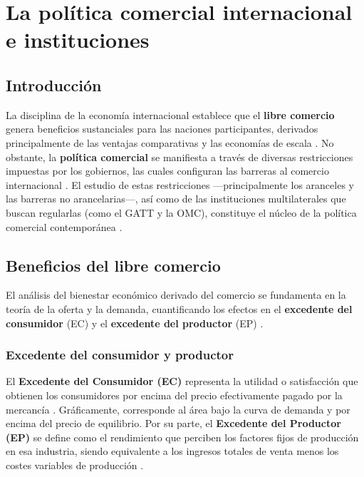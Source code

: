 \chapter{La política comercial internacional e instituciones}

\section{Introducción}

La disciplina de la economía internacional establece que el \textbf{libre comercio} genera beneficios sustanciales para las naciones participantes, derivados principalmente de las ventajas comparativas y las economías de escala . No obstante, la \textbf{política comercial} se manifiesta a través de diversas restricciones impuestas por los gobiernos, las cuales configuran las barreras al comercio internacional . El estudio de estas restricciones —principalmente los aranceles y las barreras no arancelarias—, así como de las instituciones multilaterales que buscan regularlas (como el GATT y la OMC), constituye el núcleo de la política comercial contemporánea .

\section{Beneficios del libre comercio}
El análisis del bienestar económico derivado del comercio se fundamenta en la teoría de la oferta y la demanda, cuantificando los efectos en el \textbf{excedente del consumidor} (EC) y el \textbf{excedente del productor} (EP) .

\subsection{Excedente del consumidor y productor}
El \textbf{Excedente del Consumidor (EC)} representa la utilidad o satisfacción que obtienen los consumidores por encima del precio efectivamente pagado por la mercancía . Gráficamente, corresponde al área bajo la curva de demanda y por encima del precio de equilibrio. Por su parte, el \textbf{Excedente del Productor (EP)} se define como el rendimiento que perciben los factores fijos de producción en esa industria, siendo equivalente a los ingresos totales de venta menos los costes variables de producción .

